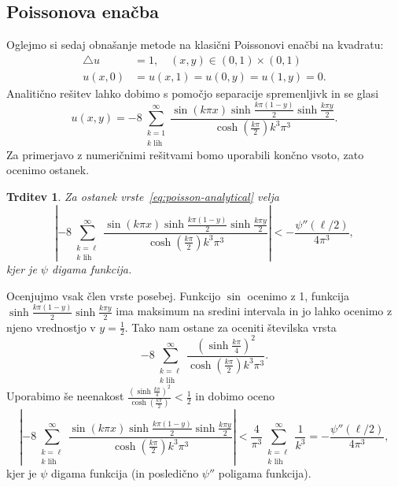 \documentclass[12pt,a4paper]{article}
\theoremstyle{definition} %
\theoremstyle{plain} %
\newtheorem{trditev}[definicija]{Trditev}
\numberwithin{equation}{section}
\begin{document}
\subsection{Poissonova enačba}
Oglejmo si sedaj obnašanje metode na klasični Poissonovi enačbi na kvadratu:
\begin{align}
  \triangle u &= 1, \quad (x, y) \in (0, 1) \times (0, 1)
  \label{eq:poisson-problem} \\
  u(x, 0) &= u(x, 1) = u(0, y) = u(1, y) = 0. \nonumber
\end{align}
Analitično rešitev lahko dobimo s pomočjo separacije spremenljivk in se glasi
\begin{equation}
  u(x, y) =
  -8 \sum_{\substack{k=1 \\ k \text{ lih}}}^\infty \frac{ \sin (k \pi  x) \sinh
  \frac{k \pi  (1-y)}{2} \sinh \frac{k \pi
y}{2}}{\cosh(\frac{k\pi}{2})k^3 \pi ^3}.
  \label{eq:poisson-analytical}
\end{equation}
Za primerjavo z numeričnimi rešitvami bomo uporabili končno vsoto, zato ocenimo
ostanek.
\begin{trditev}
  Za ostanek vrste~\eqref{eq:poisson-analytical} velja
  \[
    \left|-8 \sum_{\substack{k=\ell \\ k \text{ lih}}}^\infty \frac{ \sin (k \pi  x) \sinh
      \frac{k \pi  (1-y)}{2} \sinh \frac{k \pi y}{2}}{\cosh(\frac{k\pi}{2})k^3
      \pi ^3}\right| < -\frac{\psi''(\ell/2)}{4 \pi^3},
  \]
  kjer je $\psi$ digama funkcija.
\end{trditev}
\proof
Ocenjujmo vsak člen vrste posebej. Funkcijo $\sin$ ocenimo z 1, funkcija
$\sinh \frac{k \pi  (1-y)}{2} \sinh \frac{k \pi y}{2}$ ima maksimum na sredini
intervala in jo lahko ocenimo z njeno vrednostjo v $y = \frac{1}{2}$.
Tako nam ostane za oceniti številska vrsta
\[
    -8 \sum_{\substack{k=\ell \\ k \text{ lih}}}^\infty
    \frac{\left(\sinh\frac{k \pi}{4}\right)^2}{\cosh(\frac{k\pi}{2})k^3
    \pi ^3} .
\]
Uporabimo še neenakost $\frac{\left(\sinh\frac{k
\pi}{4}\right)^2}{\cosh(\frac{k\pi}{2})} < \frac{1}{2}$ in dobimo oceno
\[
\left|-8 \sum_{\substack{k=\ell \\ k \text{ lih}}}^\infty \frac{ \sin (k \pi  x) \sinh
      \frac{k \pi  (1-y)}{2} \sinh \frac{k \pi y}{2}}{\cosh(\frac{k\pi}{2})k^3
      \pi ^3}\right| < \frac{4}{\pi^3} \sum_{\substack{k=\ell \\ k \text{ lih}}}^\infty
      \frac{1}{k^3} = -\frac{\psi''(\ell/2)}{4 \pi^3},
\]
kjer je $\psi$ digama funkcija (in posledično $\psi''$ poligama funkcija).
\end{document}
